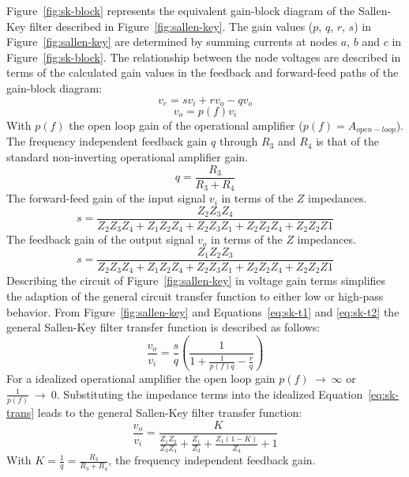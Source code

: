 Figure~\vref{fig:sk-block} represents the equivalent gain-block
diagram of the Sallen-Key filter described in
Figure~\vref{fig:sallen-key}. The gain values ($p$, $q$, $r$, $s$) in
Figure~\ref{fig:sallen-key} are determined by summing currents at
nodes $a$, $b$ and $c$ in Figure~\vref{fig:sk-block}. The relationship
between the node voltages are described in terms of the calculated
gain values in the feedback and forward-feed paths of the gain-block
diagram:
\begin{equation}
	v_e = sv_i + rv_o - qv_o	
	\label{eq:sk-t1}
\end{equation}
\begin{equation}
	v_o = p(f)v_i
	\label{eq:sk-t2}
\end{equation}
With $p(f)$ the open loop gain of the operational amplifier ($p(f) =
A_{open-loop}$). The frequency independent feedback gain $q$ through
$R_3$ and $R_4$ is that of the standard non-inverting operational
amplifier gain.
\begin{equation}
	q = \frac{R_3}{R_3 + R_4}
\end{equation}
The forward-feed gain of the input signal $v_i$ in terms of the $Z$
impedances.
\begin{equation}
	s = \frac{Z_2Z_3Z_4}{Z_2Z_3Z_4 + Z_1Z_2Z_4 + Z_2Z_3Z_1 + Z_2Z_2Z_4
	+ Z_2Z_2Z1}
\end{equation}
The feedback gain of the output signal $v_o$ in terms of the $Z$
impedances.
\begin{equation}
	s = \frac{Z_1Z_2Z_3}{Z_2Z_3Z_4 + Z_1Z_2Z_4 + Z_2Z_3Z_1 + Z_2Z_2Z_4
	+ Z_2Z_2Z1}
\end{equation}
Describing the circuit of Figure~\vref{fig:sallen-key} in voltage gain
terms simplifies the adaption of the general circuit transfer function
to either low or high-pass behavior. From Figure~\ref{fig:sallen-key}
and Equations~\ref{eq:sk-t1} and \ref{eq:sk-t2} the general Sallen-Key
filter transfer function is described as follows:
\begin{equation}
	\frac{v_o}{v_i} = \frac{s}{q}\left( \frac{1}{1 + \frac{1}{p(f)q}
	-\frac{r}{q}}\right ) 
	\label{eq:sk-trans}
\end{equation}
For a idealized operational amplifier the open loop gain
$p(f)~\rightarrow~\infty$ or
$\frac{1}{p(f)}~\rightarrow~0$. Substituting the impedance terms into
the idealized Equation~\ref{eq:sk-trans} leads to the general
Sallen-Key filter transfer function:
\begin{equation}
\frac{v_o}{v_i} = \frac{K}{\frac{Z_1Z_2}{Z_3Z_4} + \frac{Z_1}{Z_3} +
\frac{Z_1(1 - K)}{Z_4} + 1}
	\label{eq:sk-gen-tans}
\end{equation}
With $K = \frac{1}{q} = \frac{R_3}{R_3 + R_4}$, the frequency
independent feedback gain.

